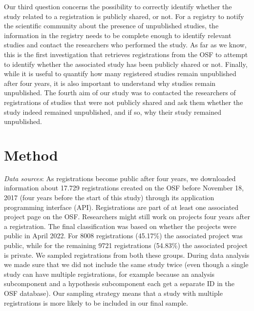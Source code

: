 \documentclass[
  ,jou, a4paper,floatsintext]{apa6}
\begin{document}
Our third question concerns the possibility to correctly identify whether the study related to a registration is publicly shared, or not. For a registry to notify the scientific community about the presence of unpublished studies, the information in the registry needs to be complete enough to identify relevant studies and contact the researchers who performed the study. As far as we know, this is the first investigation that retrieves registrations from the OSF to attempt to identify whether the associated study has been publicly shared or not.
Finally, while it is useful to quantify how many registered studies remain unpublished after four years, it is also important to understand why studies remain unpublished. The fourth aim of our study was to contacted the researchers of registrations of studies that were not publicly shared and ask them whether the study indeed remained unpublished, and if so, why their study remained unpublished.

\hypertarget{method}{%
\section{Method}\label{method}}

\emph{Data sources}: As registrations become public after four years, we downloaded information about 17.729 registrations created on the OSF before November 18, 2017 (four years before the start of this study) through its application programming interface (API). Registrations are part of at least one associated project page on the OSF. Researchers might still work on projects four years after a registration. The final classification was based on whether the projects were public in April 2022. For 8008 registrations (45.17\%) the associated project was public, while for the remaining 9721 registrations (54.83\%) the associated project is private. We sampled registrations from both these groups. During data analysis we made sure that we did not include the same study twice (even though a single study can have multiple registrations, for example because an analysis subcomponent and a hypothesis subcomponent each get a separate ID in the OSF database). Our sampling strategy means that a study with multiple registrations is more likely to be included in our final sample.
\end{document}
